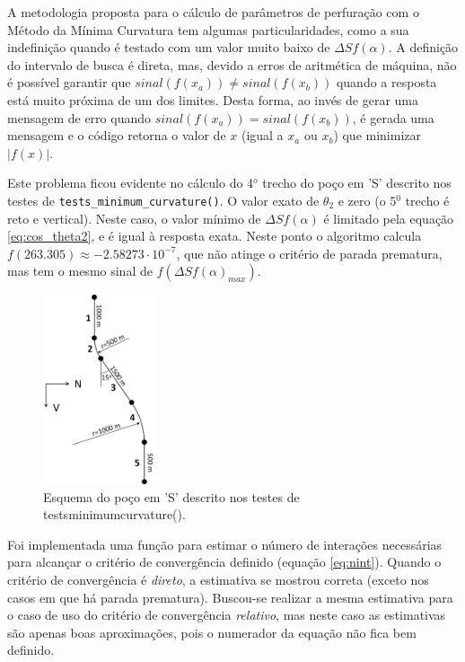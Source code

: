 \documentclass[final,3p,12pt]{elsarticle}
\begin{document}
    A metodologia proposta para o cálculo de parâmetros de perfuração com o Método da Mínima Curvatura tem algumas particularidades, como a sua indefinição quando é testado com um valor muito baixo de $\Delta S f(\alpha)$. A definição do intervalo de busca é direta, mas, devido a erros de aritmética de máquina, não é possível garantir que $sinal(f(x_a)) \neq sinal(f(x_b))$ quando a resposta está muito próxima de um dos limites. Desta forma, ao invés de gerar uma mensagem de erro quando $sinal(f(x_a)) = sinal(f(x_b))$, é gerada uma mensagem e o código retorna o valor de $x$ (igual a $x_a$ ou $x_b$) que minimizar $|f(x)|$.
    
    Este problema ficou evidente no cálculo do 4$^o$ trecho do poço em 'S' descrito nos testes de \verb|tests_minimum_curvature()|. O valor exato de $\theta_2$ e zero (o 5$^0$ trecho é reto e vertical). Neste caso, o valor mínimo de $\Delta S f(\alpha)$ é limitado pela equação \ref{eq:cos_theta2}, e é igual à resposta exata. Neste ponto o algoritmo calcula $f(263.305) \approx -2.58273 \cdot 10^{-7}$, que não atinge o critério de parada prematura, mas tem o mesmo sinal de $f(\Delta S f(\alpha)_{max})$.

    \begin{figure}[h]
        \centering
        \includegraphics[width=0.3\textwidth]{EsquemaPoco}
        \caption{Esquema do poço em 'S' descrito nos testes de tests\textunderscore minimum\textunderscore curvature().}
        \label{fig:pocoS}
    \end{figure}
    
    Foi implementada uma função para estimar o número de interações necessárias para alcançar o critério de convergência definido (equação \ref{eq:nint}). Quando o critério de convergência é \emph{direto}, a estimativa se mostrou correta (exceto nos casos em que há parada prematura). Buscou-se realizar a mesma estimativa para o caso de uso do critério de convergência \emph{relativo}, mas neste caso as estimativas são apenas boas aproximações, pois o numerador da equação não fica bem definido.
\end{document}
